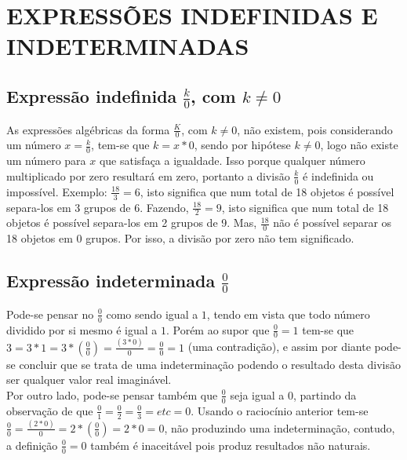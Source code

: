 \chapter{EXPRESSÕES INDEFINIDAS E INDETERMINADAS}
\label{cap:indet}

\section{Expressão indefinida $\displaystyle \frac{k}{0}$, com  $k \neq 0$}
\label{sec:expindk0}
\quad As expressões algébricas da forma  $\displaystyle \frac{K}{0}$, com $k \neq 0$, não existem, pois considerando um número $\displaystyle x= \frac{k}{0}$, tem-se que $k = x * 0$, sendo por hipótese $k \neq 0$, logo não existe um número para $x$ que satisfaça a igualdade. Isso porque qualquer número multiplicado por zero resultará em zero, portanto a divisão $\displaystyle \frac{k}{0}$ é indefinida ou impossível. Exemplo: $\displaystyle \frac{18}{3} = 6$, isto significa que num total de 18 objetos é possível separa-los em 3 grupos de 6.  Fazendo, $\displaystyle \frac{18}{2} = 9$, isto significa que num total de 18 objetos é possível separa-los em 2 grupos de 9. Mas, $\displaystyle \frac{18}{0}$ não é possível separar os 18 objetos em 0 grupos. Por isso, a divisão por zero não tem significado.


\section{Expressão indeterminada $\displaystyle \frac{0}{0}$}
\label{sec:fra00}
\quad Pode-se pensar no $\displaystyle \frac{0}{0}$ como sendo igual a $1$, tendo em vista que todo número dividido por si mesmo é igual a $1$. Porém ao supor que $\displaystyle \frac{0}{0} = 1$  tem-se que $3 = 3 * 1 = 3 * (\frac{0}{0}) = \frac{(3 * 0)}{0} = \frac{0}{0} = 1$ (uma contradição), e assim por diante pode-se concluir que se trata de uma indeterminação podendo o resultado desta divisão ser qualquer valor real imaginável.\\

Por outro lado, pode-se pensar também que $\displaystyle \frac{0}{0}$ seja igual a $0$, partindo da observação de que $\displaystyle \frac{0}{1} = \displaystyle \frac{0}{2}  = \displaystyle  \frac{0}{3} = etc = 0$. Usando o raciocínio anterior tem-se $\displaystyle \frac{0}{0} = \displaystyle \frac{(2*0)}{0} = \displaystyle 2 *(\frac{0}{0})= 2*0 = 0$, não produzindo uma indeterminação, contudo, a definição $\displaystyle \frac{0}{0} =  0$ também é inaceitável pois produz resultados não naturais.\\

